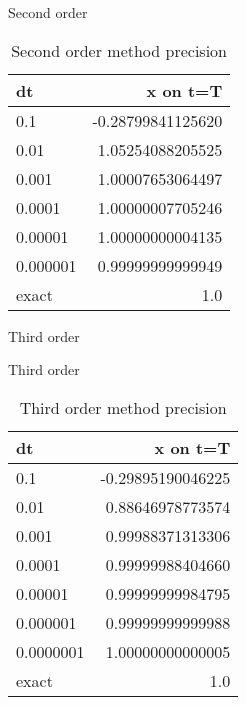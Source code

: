 \documentclass[10pt]{beamer}
\begin{document}
\begin{frame}{Second order}
  \begin{table}
    \caption{Second order method precision}
    \begin{tabular}{lr}
      \toprule
      dt & x on t=T\\
      \midrule
      0.1 & -0.28799841125620\\
      0.01 & 1.05254088205525\\
      0.001 & 1.00007653064497\\
      0.0001 & 1.00000007705246\\
      0.00001 & 1.00000000004135\\
      0.000001 & 0.99999999999949\\
      \midrule
      exact & 1.0 \\
      \bottomrule
    \end{tabular}
  \end{table}
\end{frame}

\begin{frame}{Third order}
  \begin{figure}
  \end{figure}
\end{frame}

\begin{frame}{Third order}
  \begin{table}
    \caption{Third order method precision}
    \begin{tabular}{lr}
      \toprule
      dt & x on t=T\\
      \midrule
      0.1 & -0.29895190046225\\
      0.01 & 0.88646978773574\\
      0.001 & 0.99988371313306\\
      0.0001 & 0.99999988404660\\
      0.00001 & 0.99999999984795\\
      0.000001 & 0.99999999999988\\
      0.0000001 & 1.00000000000005\\
      \midrule
      exact & 1.0 \\
      \bottomrule
    \end{tabular}
  \end{table}
\end{frame}
\end{document}
